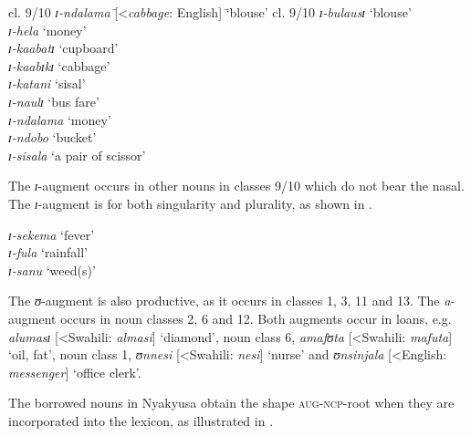 \documentclass[output=paper]{langscibook}
\begin{document}
\ea%
    \label{ex:lusekelo:2}
    \begin{tabbing}
cl. 9/10 \= \textit{ɪ{}-ndalama} \= [<\textit{cabbage}: English] \= ‘blouse’\kill
 cl. 9/10 \> \textit{ɪ{}-bulausɪ}  \> ‘blouse’ \\
   \> \textit{ɪ{}-hela}  \> ‘money’ \\
   \> \textit{ɪ{}-kaabatɪ}  \> ‘cupboard’ \\
   \> \textit{ɪ{}-kaabɪkɪ}  \> ‘cabbage’ \\
   \> \textit{ɪ{}-katani}  \> ‘sisal’ \\
   \> \textit{ɪ{}-naulɪ}  \> ‘bus fare’ \\
   \> \textit{ɪ{}-ndalama}  \> ‘money’ \\
   \> \textit{ɪ{}-ndobo}  \> ‘bucket’   \\
   \> \textit{ɪ{}-sisala}  \> ‘a pair of scissor’
   \end{tabbing}
\z

The \textit{ɪ}{}-augment occurs in other nouns in classes 9/10 which do not bear the nasal. The \textit{ɪ}{}-augment is for both singularity and plurality, as shown in .  

\ea%
    \label{ex:lusekelo:3}
  \textit{ɪ{}-sekema}  \normalfont‘fever’ \\
  {}  \textit{ɪ{}-fula}  ‘rainfall’ \\
  {}  \textit{ɪ{}-sanu}  ‘weed(s)’\\
\z

The \textit{ʊ}{}-augment is also productive, as it occurs in classes 1, 3, 11 and 13. The \textit{a}{}-augment occurs in noun classes 2, 6 and 12. Both augments occur in loans, e.g.  \textit{alumasɪ} [<Swahili: \textit{almasi}] ‘diamond’, noun class 6, \textit{amafʊta} [<Swahili: \textit{mafuta}] ‘oil, fat’,  noun class 1, \textit{ʊnnesi} [<Swahili: \textit{nesi}] ‘nurse’ and \textit{ʊnsinjala} [<English: \textit{messenger}] ‘office clerk’. 

The borrowed nouns in Nyakyusa obtain the shape \textsc{aug-ncp}-root when they are incorporated into the lexicon, as illustrated in .
\end{document}

